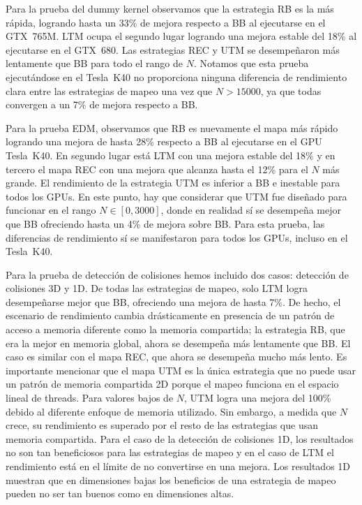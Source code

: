 \documentclass[twocolumn,10pt,a4paper]{article}
\begin{document}
Para la prueba del dummy kernel observamos que la estrategia RB es la más
rápida, logrando hasta un 33\% de mejora respecto a BB al ejecutarse en el
GTX~765M. LTM ocupa el segundo lugar logrando una mejora estable del 18\% al
ejecutarse en el GTX~680. Las estrategias REC y UTM se desempeñaron más
lentamente que BB para todo el rango de $N$. Notamos que esta prueba
ejecutándose en el Tesla~K40 no proporciona ninguna diferencia de rendimiento
clara entre las estrategias de mapeo una vez que $N > 15000$, ya que todas
convergen a un 7\% de mejora respecto a BB.

Para la prueba EDM, observamos que RB es nuevamente el mapa más rápido
logrando una mejora de hasta 28\% respecto a BB al ejecutarse en el GPU
Tesla~K40. En segundo lugar está LTM con una mejora estable del 18\% y en
tercero el mapa REC con una mejora que alcanza hasta el 12\% para el $N$ más
grande. El rendimiento de la estrategia UTM es inferior a BB e inestable para
todos los GPUs. En este punto, hay que considerar que UTM fue diseñado para
funcionar en el rango $N \in [0, 3000]$, donde en realidad sí se desempeña
mejor que BB ofreciendo hasta un 4\% de mejora sobre BB. Para esta prueba,
las diferencias de rendimiento sí se manifestaron para todos los GPUs, incluso
en el Tesla~K40.

Para la prueba de detección de colisiones hemos incluido dos casos: detección
de colisiones 3D y 1D. De todas las estrategias de mapeo, solo LTM logra
desempeñarse mejor que BB, ofreciendo una mejora de hasta 7\%. De hecho, el
escenario de rendimiento cambia drásticamente en presencia de un patrón de
acceso a memoria diferente como la memoria compartida; la estrategia RB, que
era la mejor en memoria global, ahora se desempeña más lentamente que BB. El
caso es similar con el mapa REC, que ahora se desempeña mucho más lento. Es
importante mencionar que el mapa UTM es la única estrategia que no puede usar
un patrón de memoria compartida 2D porque el mapeo funciona en el espacio
lineal de threads. Para valores bajos de $N$, UTM logra una mejora del 100\%
debido al diferente enfoque de memoria utilizado. Sin embargo, a medida que
$N$ crece, su rendimiento es superado por el resto de las estrategias que usan
memoria compartida. Para el caso de la detección de colisiones 1D, los
resultados no son tan beneficiosos para las estrategias de mapeo y en el caso
de LTM el rendimiento está en el límite de no convertirse en una mejora. Los
resultados 1D muestran que en dimensiones bajas los beneficios de una
estrategia de mapeo pueden no ser tan buenos como en dimensiones altas.
\end{document}

